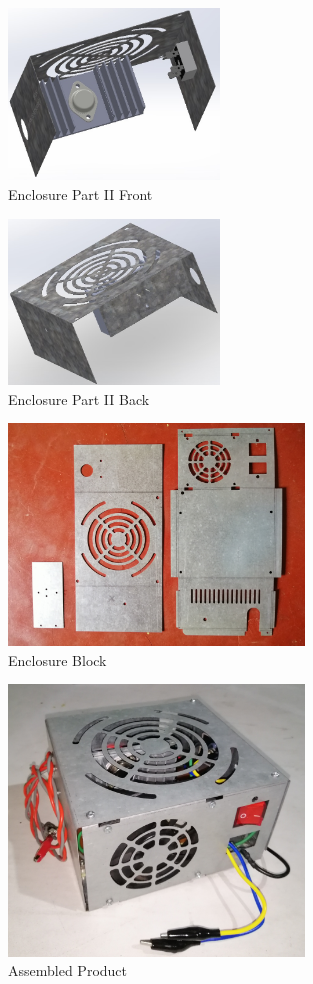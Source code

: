\documentclass[11pt]{article}
\begin{document}
\begin{multicols}{2}
\begin{figure}[H]
    \centering
    \includegraphics[width=0.5\textwidth]{enclosure photos/img 4.jpg}
    \caption{Enclosure Part II Front}
\end{figure}

\begin{figure}[H]
    \centering
    \includegraphics[width=0.5\textwidth]{enclosure photos/img 5.jpg}
    \caption{Enclosure Part II Back}
\end{figure}
\end{multicols}


\begin{figure}[H]
    \centering
    \includegraphics[width=0.7\textwidth]{block_enclosure.jpg}
    \caption{Enclosure Block}
\end{figure}

\begin{figure}[H]
    \centering
    \includegraphics[width=0.7\textwidth]{LPS.jpg}
    \caption{Assembled Product}
\end{figure}
\end{document}
